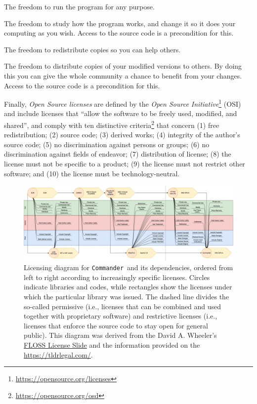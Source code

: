 \documentclass[twocolumn]{openjournal}
\def\commander{\texttt{Commander}}
\begin{document}
 The freedom to run the program for any
purpose.

 The freedom to study how the program works,
and change it so it does your computing as you wish. Access to the
source code is a precondition for this.

 The freedom
to redistribute copies so you can help others.

 The
freedom to distribute copies of your modified versions to others. By
doing this you can give the whole community a chance to benefit from
your changes. Access to the source code is a precondition for this.

Finally, \textit{Open Source licenses} are defined by the \textit{Open Source
Initiative}\footnote{\url{https://opensource.org/licenses}} (OSI) and include
licenses that ``allow the software to be freely used, modified, and shared'',
and comply with ten distinctive
criteria\footnote{\url{https://opensource.org/osd}} that concern (1) free
redistribution; (2) source code; (3) derived works; (4) integrity of the
author's source code; (5) no discrimination against persons or groups; (6) no
discrimination against fields of endeavor; (7) distribution of license; (8) the
license must not be specific to a product; (9) the license must not restrict
other software; and (10) the license must be technology-neutral.

\begin{figure}[ht]
    \center
    \includegraphics[width=\linewidth]{figures/Commander_Licenses_Diagram_v5.png}
    \caption{Licensing diagram
      for \commander\ and its dependencies,
      ordered from left to right according to increasingly specific
      licenses. Circles indicate libraries and codes, while rectangles
      show the licenses under which the particular library was
      issued. The dashed line divides the so-called permissive (i.e.,
      licenses that can be combined and used together with proprietary
      software) and restrictive licenses (i.e., licenses that enforce
      the source code to stay open for general public). This diagram 
      was derived from the David A. Wheeler's 
      \href{https://dwheeler.com/essays/floss-license-slide.html}{FLOSS License Slide}
      and the information provided on the \url{https://tldrlegal.com/}.} 
    \label{fig:licensing_diagram}
\end{figure}
\end{document}
